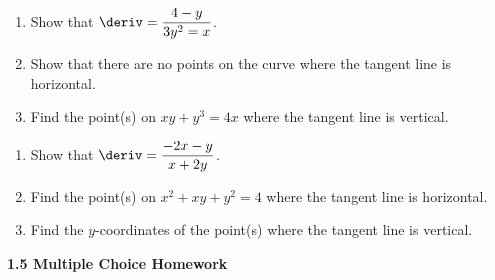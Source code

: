 \begin{enumerate}[label=\hspace{11pt}(\alph*), align=left, leftmargin=*, labelsep=0.25em]
    \item Show that $\deriv = \dfrac{4 - y}{3y^2 = x}$.
    \item Show that there are no points on the curve where the tangent line is horizontal.
    \item Find the point(s) on $xy + y^3 = 4x$ where the tangent line is vertical.
\end{enumerate} \vspace{11pt}

\begin{enumerate}[label=\hspace{11pt}(\alph*), align=left, leftmargin=*, labelsep=0.25em]
    \item Show that $\deriv = \dfrac{-2x - y}{x + 2y}$.
    \item Find the point(s) on $x^2 + xy + y^2 = 4$ where the tangent line is horizontal.
    \item Find the $y$-coordinates of the point(s) where the tangent line is vertical.
\end{enumerate} \vspace{11pt}

\textbf{\large{1.5 Multiple Choice Homework}} \par

